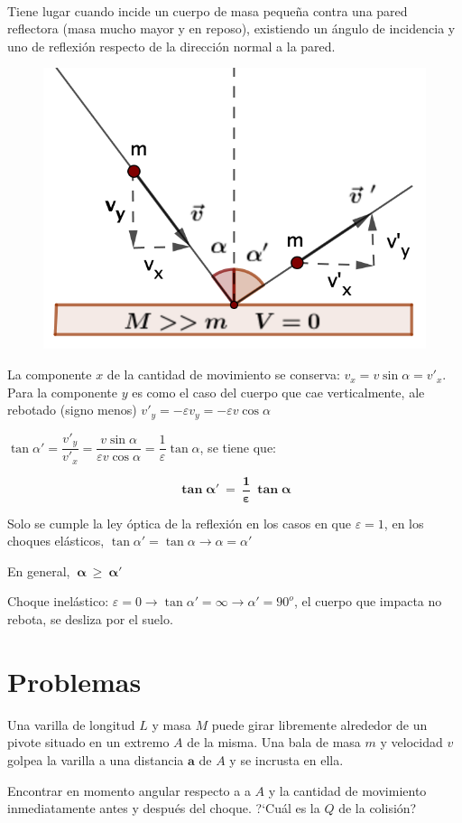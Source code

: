\begin{multicols}{2}
$\quad$

Tiene lugar cuando incide un cuerpo de masa pequeña contra una pared reflectora (masa mucho mayor y en reposo), existiendo un ángulo de incidencia y uno de reflexión respecto de la dirección normal a la pared. 
\begin{figure}[H]
	\centering
	\includegraphics[width=.5\textwidth]{imagenes/imagenes17/T17IM06.png}
	\end{figure}
\end{multicols}

La componente $x$ de la cantidad de movimiento se conserva: $v_x=v\sin \alpha =v'_x$. Para la componente $y$ es como el caso del cuerpo que cae verticalmente, ale rebotado (signo menos) $v'_y=-\varepsilon v_y=-\varepsilon v \cos \alpha$

$\tan \alpha' =\dfrac {v'_y}{v'_x}=\dfrac{v \sin \alpha}{\varepsilon v \cos \alpha}=\dfrac 1 \varepsilon \tan \alpha$, se tiene que:

\begin{equation}
\boldsymbol{ \tan \alpha' \ =\ \dfrac 1 \varepsilon \ \tan \alpha }
\end{equation}

Solo se cumple la ley óptica de la reflexión en los casos en que $\varepsilon =1$, en los choques elásticos, $\tan \alpha' =  \tan \alpha \to \alpha=\alpha'$

En general, $\ \boldsymbol{\alpha \ \geq \ \alpha' \ }$

Choque inelástico: $\varepsilon = 0 \to \tan \alpha'=\infty \to \alpha'=90^o$, el cuerpo que impacta no rebota, se desliza por el suelo.

\section{Problemas}

\begin{prob}
Una varilla de longitud $L$ y masa $M$ puede girar libremente alrededor de un pivote situado en un extremo $A$ de la misma. Una bala de masa $m$ y velocidad $v$ golpea la varilla a una distancia $\boldsymbol{a}$ de $A$ y se incrusta en ella.

Encontrar en momento angular respecto a a $A$ y la cantidad de movimiento inmediatamente antes y después del choque. ?`Cuál es la $Q$ de la colisión?	
\end{prob}

